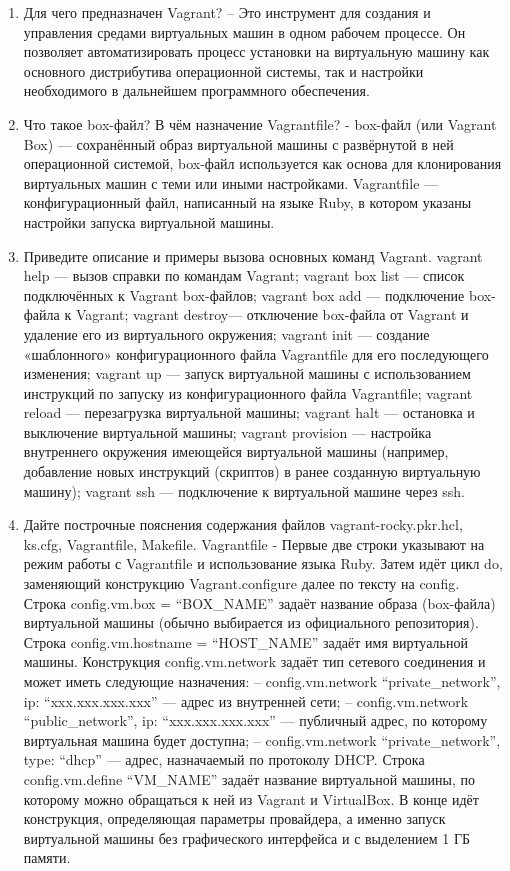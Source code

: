 \documentclass[
  12pt,
  a4paper,
  DIV=11,
  numbers=noendperiod]{scrreprt}
\begin{document}
\begin{enumerate}
\def\labelenumi{\arabic{enumi}.}
\item
  Для чего предназначен Vagrant? -- Это инструмент для создания и
  управления средами виртуальных машин в одном рабочем процессе. Он
  позволяет автоматизировать процесс установки на виртуальную машину как
  основного дистрибутива операционной системы, так и настройки
  необходимого в дальнейшем программного обеспечения.
\item
  Что такое box-файл? В чём назначение Vagrantfile? - box-файл (или
  Vagrant Box) --- сохранённый образ виртуальной машины с развёрнутой в
  ней операционной системой, box-файл используется как основа для
  клонирования виртуальных машин с теми или иными настройками.
  Vagrantfile --- конфигурационный файл, написанный на языке Ruby, в
  котором указаны настройки запуска виртуальной машины.
\item
  Приведите описание и примеры вызова основных команд Vagrant. vagrant
  help --- вызов справки по командам Vagrant; vagrant box list ---
  список подключённых к Vagrant box-файлов; vagrant box add ---
  подключение box-файла к Vagrant; vagrant destroy--- отключение
  box-файла от Vagrant и удаление его из виртуального окружения; vagrant
  init --- создание «шаблонного» конфигурационного файла Vagrantfile для
  его последующего изменения; vagrant up --- запуск виртуальной машины с
  использованием инструкций по запуску из конфигурационного файла
  Vagrantfile; vagrant reload --- перезагрузка виртуальной машины;
  vagrant halt --- остановка и выключение виртуальной машины; vagrant
  provision --- настройка внутреннего окружения имеющейся виртуальной
  машины (например, добавление новых инструкций (скриптов) в ранее
  созданную виртуальную машину); vagrant ssh --- подключение к
  виртуальной машине через ssh.
\item
  Дайте построчные пояснения содержания файлов vagrant-rocky.pkr.hcl,
  ks.cfg, Vagrantfile, Makefile. Vagrantfile - Первые две строки
  указывают на режим работы с Vagrantfile и использование языка Ruby.
  Затем идёт цикл do, заменяющий конструкцию Vagrant.configure далее по
  тексту на config. Строка config.vm.box = \enquote{BOX\_NAME} задаёт
  название образа (box-файла) виртуальной машины (обычно выбирается из
  официального репозитория). Строка config.vm.hostname =
  \enquote{HOST\_NAME} задаёт имя виртуальной машины. Конструкция
  config.vm.network задаёт тип сетевого соединения и может иметь
  следующие назначения: -- config.vm.network \enquote{private\_network},
  ip: \enquote{xxx.xxx.xxx.xxx} --- адрес из внутренней сети; --
  config.vm.network \enquote{public\_network}, ip:
  \enquote{xxx.xxx.xxx.xxx} --- публичный адрес, по которому виртуальная
  машина будет доступна; -- config.vm.network
  \enquote{private\_network}, type: \enquote{dhcp} --- адрес,
  назначаемый по протоколу DHCP. Строка config.vm.define
  \enquote{VM\_NAME} задаёт название виртуальной машины, по которому
  можно обращаться к ней из Vagrant и VirtualBox. В конце идёт
  конструкция, определяющая параметры провайдера, а именно запуск
  виртуальной машины без графического интерфейса и с выделением 1 ГБ
  памяти.
\end{enumerate}
\end{document}
